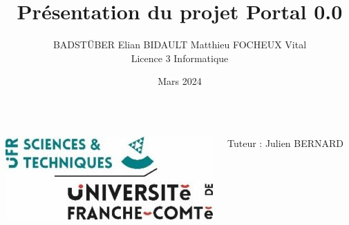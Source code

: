\documentclass{beamer}
\begin{document}

\title{Présentation du projet Portal 0.0}
\author[BADSTÜBER E. BIDAULT M. FOCHEUX V.]{BADSTÜBER Elian BIDAULT Matthieu FOCHEUX Vital \\
                                                Licence 3 Informatique}
\date{Mars 2024}


\setcounter{framenumber}{0}

{
\begin{frame}
    \titlepage
    
    \vfill %
    \begin{columns}
        \centering
        \includegraphics[width=\textwidth]{images/logo-UFR-ST.jpg} 
    
        \begin{flushright}
            \small Tuteur : Julien BERNARD
        \end{flushright}    
    \end{columns}
\end{frame}
}
\end{document}

